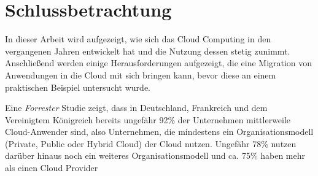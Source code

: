 \chapter{Schlussbetrachtung}
In dieser Arbeit wird aufgezeigt, wie sich das Cloud Computing in den vergangenen Jahren entwickelt hat und die Nutzung dessen stetig zunimmt. Anschließend werden einige Herausforderungen aufgezeigt, die eine Migration von Anwendungen in die Cloud mit sich bringen kann, bevor diese an einem praktischen Beispiel untersucht wurde.

Eine \textit{Forrester} Studie zeigt, dass in Deutschland, Frankreich und dem Vereinigtem Königreich bereits ungefähr 92\% der Unternehmen mittlerweile Cloud-Anwender sind, also Unternehmen, die mindestens ein Organisationsmodell (Private, Public oder Hybrid Cloud) der Cloud nutzen. Ungefähr 78\% nutzen darüber hinaus noch ein weiteres Organisationsmodell und ca. 75\% haben mehr als einen Cloud Provider \cite[Vgl.][S. 4]{Rajamani2022} \pagebreak